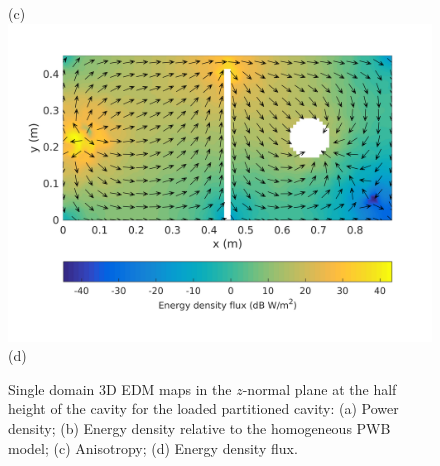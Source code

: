 \documentclass[a4paper]{article}
\numberwithin{equation}{section}
\begin{document}
\begin{figure}[hp]
\begin{center}
{\footnotesize (c)}\\
\vspace{2mm}
\includegraphics[trim={0 8mm 0 12mm},clip,width=0.52\linewidth]{figures/SDM_3D_DL_EnergyDensityFluxMap}\\
{\footnotesize (d)}\\
\vspace{-2mm}
\caption{\label{fg:partcylsdm_maps} Single domain 3D EDM maps in the $z$-normal plane at the half height of the cavity for the 
loaded partitioned cavity: (a) Power density; (b) Energy density relative to the homogeneous PWB model;
(c) Anisotropy; (d) Energy density flux.}
\end{center}
\end{figure}
\end{document}
